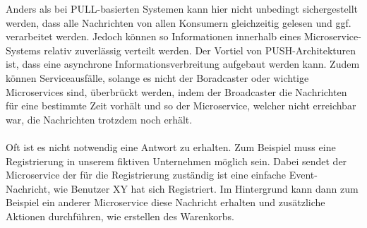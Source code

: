 Anders als bei PULL-basierten Systemen kann hier nicht unbedingt sichergestellt werden, dass alle Nachrichten von allen Konsumern gleichzeitig gelesen und ggf. verarbeitet werden. Jedoch können so Informationen innerhalb eines Microservice-Systems relativ zuverlässig verteilt werden.
Der Vortiel von PUSH-Architekturen ist, dass eine asynchrone Informationsverbreitung aufgebaut werden kann. Zudem können Serviceausfälle, solange es nicht der Boradcaster oder wichtige Microservices sind, überbrückt werden, indem der Broadcaster die Nachrichten für eine bestimmte Zeit vorhält und so der Microservice, welcher nicht erreichbar war, die Nachrichten trotzdem noch erhält.
\\\\
Oft ist es nicht notwendig eine Antwort zu erhalten. Zum Beispiel muss eine Registrierung in unserem fiktiven Unternehmen möglich sein. Dabei sendet der Microservice der für die Registrierung zuständig ist eine einfache Event-Nachricht, wie Benutzer XY hat sich Registriert. Im Hintergrund kann dann zum Beispiel ein anderer Microservice diese Nachricht erhalten und zusätzliche Aktionen durchführen, wie erstellen des Warenkorbs.